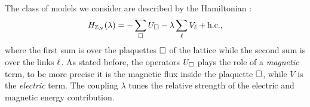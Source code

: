 The class of models we consider are described by the Hamiltonian \cite{tagliacozzo2011entanglement, hamma2008adiabatic, trebst2007topological}:
\begin{equation}
    H_{\mathbb{Z}_N}(\lambda) = - \sum_{\square} U_{\square} - \lambda \sum_{\ell} V_{\ell} + \text{h.c.},
    \label{eq:hamiltonian_base}
\end{equation}
where the first sum is over the plaquettes $\square$ of the lattice while the second sum is over the links $\ell$.
As stated before, the operators $U_{\square}$ plays the role of a \emph{magnetic} term, to be more precise it is the magnetic flux inside the plaquette $\square$, while $V$ is the \emph{electric} term.
The coupling $\lambda$ tunes the relative strength of the electric and magnetic energy contribution.

\begin{figure}[t]
\end{figure}




